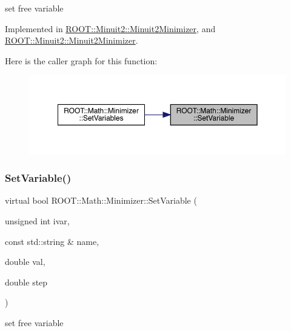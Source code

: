 set free variable 



Implemented in \mbox{\hyperlink{classROOT_1_1Minuit2_1_1Minuit2Minimizer_a951ad856f74ded3c64836fa28fdf9bb5}{R\+O\+O\+T\+::\+Minuit2\+::\+Minuit2\+Minimizer}}, and \mbox{\hyperlink{classROOT_1_1Minuit2_1_1Minuit2Minimizer_a951ad856f74ded3c64836fa28fdf9bb5}{R\+O\+O\+T\+::\+Minuit2\+::\+Minuit2\+Minimizer}}.

Here is the caller graph for this function\+:\nopagebreak
\begin{figure}[H]
\begin{center}
\leavevmode
\includegraphics[width=350pt]{dc/dc4/classROOT_1_1Math_1_1Minimizer_a8661a2ac86372602f32f97b3d9262421_icgraph}
\end{center}
\end{figure}
\mbox{\label{classROOT_1_1Math_1_1Minimizer_a8661a2ac86372602f32f97b3d9262421}} 
\subsubsection{\texorpdfstring{SetVariable()}{SetVariable()}\hspace{0.1cm}{\footnotesize\ttfamily [2/2]}}
{\footnotesize\ttfamily virtual bool R\+O\+O\+T\+::\+Math\+::\+Minimizer\+::\+Set\+Variable (\begin{DoxyParamCaption}\item[{unsigned int}]{ivar,  }\item[{const std\+::string \&}]{name,  }\item[{double}]{val,  }\item[{double}]{step }\end{DoxyParamCaption})\hspace{0.3cm}{\ttfamily [pure virtual]}}



set free variable 



